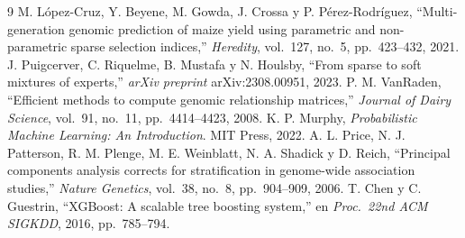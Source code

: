 \documentclass[conference]{IEEEtran}
\begin{document}
\begin{thebibliography}{9}
 M. López-Cruz, Y. Beyene, M. Gowda, J. Crossa y P. Pérez-Rodríguez, ``Multi-generation genomic prediction of maize yield using parametric and non-parametric sparse selection indices,'' \textit{Heredity}, vol.~127, no.~5, pp.~423--432, 2021.
 J. Puigcerver, C. Riquelme, B. Mustafa y N. Houlsby, ``From sparse to soft mixtures of experts,'' \textit{arXiv preprint} arXiv:2308.00951, 2023.
 P. M. VanRaden, ``Efficient methods to compute genomic relationship matrices,'' \textit{Journal of Dairy Science}, vol.~91, no.~11, pp.~4414--4423, 2008.
 K. P. Murphy, \textit{Probabilistic Machine Learning: An Introduction}. MIT Press, 2022.
 A. L. Price, N. J. Patterson, R. M. Plenge, M. E. Weinblatt, N. A. Shadick y D. Reich, ``Principal components analysis corrects for stratification in genome-wide association studies,'' \textit{Nature Genetics}, vol.~38, no.~8, pp.~904--909, 2006.
 T. Chen y C. Guestrin, ``XGBoost: A scalable tree boosting system,'' en \textit{Proc.\ 22nd ACM SIGKDD}, 2016, pp.~785--794.
\end{thebibliography}
\end{document}
